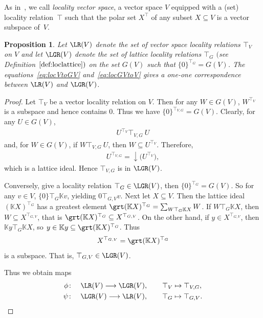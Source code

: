\documentclass[pdftex]{sigma}
\numberwithin{equation}{section}
\newtheorem{Proposition}[Theorem]{Proposition}
\newcommand{\K}{\mathbb{K}}
\newcommand{\loc}{locality\xspace}
\begin{document}
As in~\cite{CGPZ1}, we call {\it locality vector space}, a vector space $V$ equipped with a (set) \loc rela\-tion~$\top$ such that the polar set $X^\top$ of any subset $X\subseteq V$ is a vector subspace of~$V$.

\begin{Proposition} \label{pp:lvtoll}
Let $\LR(V)$ denote the set of vector space locality relations $\top_V$ on $V$ and let $\LGR(V)$ denote the set of lattice locality relations $\top_G$ $($see Definition~$\ref{def:loclattice})$ on the set $G(V)$ such that
 $\{0\}^{\top _G}=G(V)$.
The equations~\eqref{eq:locVtoGV} and~\eqref{eq:locGVtoV} gives a one-one correspondence between $\LR(V)$ and $\LGR(V)$.
\end{Proposition}

\begin {proof}
Let $\top_V$ be a vector locality relation on $V$. Then for any $W\in G(V)$, $W^{\top_V}$ is a subspace and hence contains $0$. Thus we have $\{0\}^{\top_{V,G}}=G(V)$.
%
Clearly, for any $U\in G(V)$,
\begin{gather*}
U^{\top _V}\top _{V,G} \ U
\end{gather*}
and, for $W\in G(V)$, if $W\top _{V,G} \ U$, then $W\subseteq U^{\top _V}$. Therefore,
\begin{gather}\label{eq:relvr}
 U^{\top_{V,G}} = \downarrow \big(U^{\top_V}\big),
 \end{gather}
which is a lattice ideal. Hence $\top_{V,G}$ is in $\LGR(V)$.

Conversely, give a locality relation $\top_G\in \LGR(V)$, then $\{0\}^{\top _{G}}=G(V)$. So for any $v\in V$, $\{0\}\top _{G} \K v$, yielding $0\top_{G,V} v$.
%
Next let $X \subseteq V$. Then the lattice ideal $(\K X)^{\top_G}$ has a greatest element $\grt (\K X)^{\top_G}=\sum _{W\top _G \K X}W $. If $W\top _G \K X$, then $W\subseteq X^{\top_{G,V}}$, that is $\grt (\K X)^{\top_G} \subseteq X^{\top_{G,V}}$. On the other hand, if $y\in X^{\top_{G,V}}$, then $\K y \top _G \K X$, so $y\in\K y\subseteq \grt (\K X)^{\top_G}$. Thus
\begin{gather} \label{eq:relrv}
X^{\top_{G,V}}= \grt (\K X)^{\top_G}
\end{gather}
is a subspace. That is, ${\top_{G,V}}\in \LGR (V)$.

Thus we obtain maps
\begin{gather*}
\phi\colon\quad\LR(V)\longrightarrow \LGR(V),\qquad \top_V\mapsto \top_{V,G},
\\
\psi\colon\quad\LGR(V)\longrightarrow \LR(V),\qquad \top_G\mapsto \top_{G,V}.
\end{gather*}


\end{proof}
\end{document}
